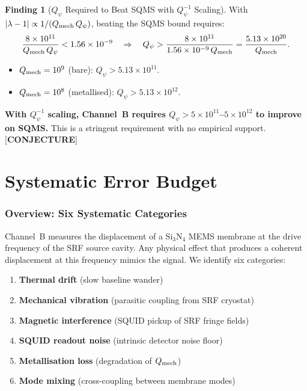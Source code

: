\documentclass[11pt]{article}
\newcommand{\lam}{\lambda}
\newcommand{\ee}[1]{\times 10^{#1}}
\newcommand{\Qpsi}{Q_\psi}
\newcommand{\Qmech}{Q_{\rm mech}}
\newcommand{\lbone}{|\lam - 1|}
\theoremstyle{definition}
\newtheorem{finding}[theorem]{Finding}
\theoremstyle{remark}
\begin{document}
\begin{finding}[$\Qpsi$ Required to Beat SQMS with $\Qpsi^{-1}$ Scaling]
\label{find:Qpsi_required_linear}
With $\lbone \propto 1/(\Qmech\,\Qpsi)$, beating the SQMS bound requires:
\begin{equation}
\frac{8\ee{11}}{\Qmech\,\Qpsi} < 1.56\ee{-9}
\quad\Rightarrow\quad
\Qpsi > \frac{8\ee{11}}{1.56\ee{-9}\,\Qmech}
= \frac{5.13\ee{20}}{\Qmech}.
\end{equation}

\begin{itemize}[nosep]
\item $\Qmech = 10^9$ (bare): $\Qpsi > 5.13\ee{11}$.
\item $\Qmech = 10^8$ (metallised): $\Qpsi > 5.13\ee{12}$.
\end{itemize}

\textbf{With $\Qpsi^{-1}$ scaling, Channel~B requires
$\Qpsi > 5\ee{11}$--$5\ee{12}$ to improve on SQMS.}
This is a stringent requirement with no empirical support.
[\textbf{CONJECTURE}]
\end{finding}


\part{Systematic Error Budget}
\label{part:systematics}

\section{Overview: Six Systematic Categories}
\label{sec:systematics_overview}

Channel~B measures the displacement of a Si$_3$N$_4$ MEMS membrane
at the drive frequency of the SRF source cavity. Any physical effect
that produces a coherent displacement at this frequency mimics the
signal. We identify six categories:

\begin{enumerate}
\item \textbf{Thermal drift} (slow baseline wander)
\item \textbf{Mechanical vibration} (parasitic coupling from SRF
  cryostat)
\item \textbf{Magnetic interference} (SQUID pickup of SRF fringe
  fields)
\item \textbf{SQUID readout noise} (intrinsic detector noise floor)
\item \textbf{Metallisation loss} (degradation of $\Qmech$)
\item \textbf{Mode mixing} (cross-coupling between membrane modes)
\end{enumerate}
\end{document}
